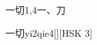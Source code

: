 \begin{entry}{一切}{1,4}{⼀、⼑}
  \begin{phonetics}{一切}{yi2qie4}[][HSK 3]
  \end{phonetics}
\end{entry}
